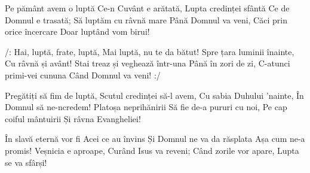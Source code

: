 \beginverse
Pe pământ avem o luptă
Ce-n Cuvânt e arătată,
Lupta credinței sfântă
Ce de Domnul e trasată;
Să luptăm cu râvnă mare
Până Domnul va veni,
Căci prin orice încercare
Doar luptând vom birui!
\endverse

\beginchorus
/: Hai, luptă, frate, luptă,
Mai luptă, nu te da bătut!
Spre țara luminii înainte,
Cu râvnă și avânt!
Stai treaz și veghează într-una
Până în zori de zi,
C-atunci primi-vei cununa
Când Domnul va veni! :/
\endchorus

\beginverse
Pregătiți să fim de luptă,
Scutul credinței să-l avem,
Cu sabia Duhului ’nainte,
În Domnul să ne-ncredem!
Platoșa neprihănirii
Să fie de-a pururi cu noi,
Pe cap coiful mântuirii
Și râvna Evangheliei!
\endverse

\beginverse
În slavă eternă vor fi
Acei ce au învins
Și Domnul ne va da răsplata
Așa cum ne-a promis!
Veșnicia e aproape,
Curând Isus va reveni;
Când zorile vor apare,
Lupta se va sfârși!
\endverse
\endsong